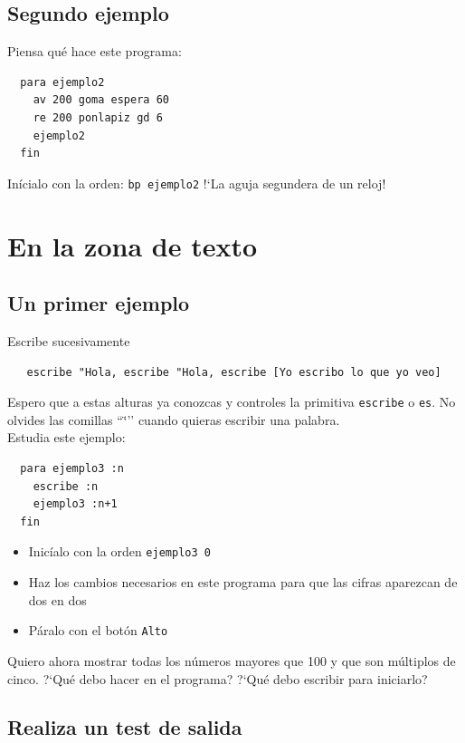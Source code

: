 \documentclass[12pt,twoside,spanish,a4paper]{report}
\begin{document}
\subsection{Segundo ejemplo}
   \label{sub:Segundo-ejemplo}

Piensa qu\'e hace este programa:
\begin{verbatim}
  para ejemplo2
    av 200 goma espera 60
    re 200 ponlapiz gd 6
    ejemplo2
  fin \end{verbatim}
In\'icialo con la orden: \texttt{bp ejemplo2} !`La aguja segundera de un reloj!

\section{En la zona de texto}
   \label{sub:Recursividad-Zona-Texto}

\subsection{Un primer ejemplo}
   \label{sub:Un-primer-ejemplo}

Escribe sucesivamente
\begin{verbatim}
   escribe "Hola, escribe "Hola, escribe [Yo escribo lo que yo veo] \end{verbatim}
Espero que a estas alturas ya conozcas y controles la primitiva \texttt{escribe}
o \texttt{es}. No olvides las comillas {}``\char`\"{}'' cuando quieras
escribir una palabra. \\

Estudia este ejemplo:
\begin{verbatim}
  para ejemplo3 :n
    escribe :n
    ejemplo3 :n+1
  fin \end{verbatim}
\begin{itemize}
   \item Inic\'ialo con la orden \texttt{ejemplo3 0}
   \item Haz los cambios necesarios en este programa para que las cifras aparezcan
      de dos en dos
   \item P\'aralo con el bot\'on \texttt{Alto}
\end{itemize}
Quiero ahora mostrar todas los n\'umeros mayores que 100 y que son m\'ultiplos
de cinco. ?`Qu\'e debo hacer en el programa? ?`Qu\'e debo escribir para
iniciarlo?

\subsection{Realiza un test de salida}
   \label{sub:Test-Salida}
\end{document}
